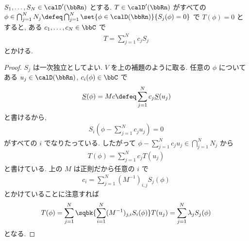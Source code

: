 \documentclass[openany, a4paper, oneside]{jsbook}
\begin{document}
\begin{thm}
$S_1, \dots, S_N \in \calD'(\bbRn)$ とする.
$T \in \calD'(\bbRn)$ がすべての $\phi \in \bigcap_{j=1}^N N_j \defeq \bigcap_{j=1}^N \set{\phi \in \calD (\bbRn)}{S_j(\phi) = 0}$ で
$T(\phi) = 0$ とすると,
ある $c_1, \dots, c_N \in \bbC$ で
\begin{align}
 T
 =
 \sum_{j=1}^N c_j S_j
\end{align}
とかける.
\end{thm}
\begin{proof}
$S_j$ は一次独立としてよい.
$V$ を上の補題のように取る.
任意の $\phi$ についてある $u_j \in \calD (\bbRn)$, $c_i(\phi) \in \bbC$ で
\begin{align}
 \underline{S}(\phi)
 =
 Mc
 \defeq
 \sum_{j=1}^N c_j \underline{S}(u_j)
\end{align}
と書けるから,
\begin{align}
 S_i (\phi - \sum_{j=1}^N c_j u_j)
 =
 0
\end{align}
がすべての $i$ でなりたっている.
したがって $\phi - \sum_{j=1}^N c_j u_j \in \bigcap_{j=1}^N N_j$
から
\begin{align}
 T(\phi)
 =
 \sum_{j=1}^N c_j T(u_j)
\end{align}
と書けている.
上の $M$ は正則だから任意の $i$ で
\begin{align}
 c_i
 =
 \sum_{j=1}^N (M^{-1})_{i,j} S_j(\phi)
\end{align}
とかけていることに注意すれば
\begin{align}
 T (\phi)
 =
 \sum_{j=1}^N \sqbk{\sum_{i=1}^N (M^{-1})_{j,i}S_i(\phi)} T(u_j)
 =
 \sum_{j=1}^N \lambda_j S_j (\phi)
\end{align}
となる.
\end{proof}
\end{document}
